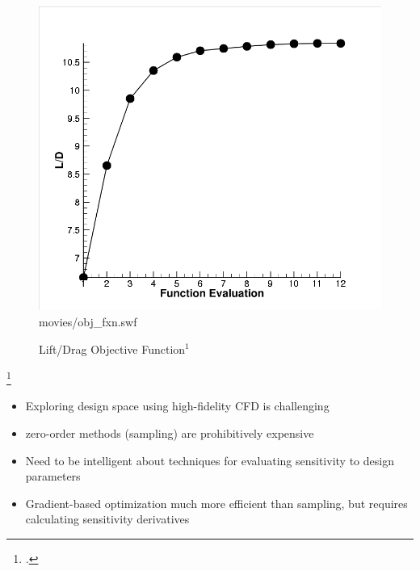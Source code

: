 \documentclass{beamer}
\begin{document}
\begin{frame}
\begin{figure}[ht]
\begin{minipage}[b]{0.45\linewidth}
\begin{cboxt}[white]
           {\includegraphics{movies/obj_fxn.png}}{movies/obj_fxn.swf}
         \end{cboxt}
         \vspace{-0.4cm}
         \caption{\tiny Lift/Drag Objective Function$^1$}
     \end{minipage}
  \end{figure}
  \footcitetext{Credit: FUN3D Tutorial Examples}
  \vspace{-1.2cm}
  \begin{itemize}
    \item Exploring design space using high-fidelity CFD is challenging
    \item zero-order methods (sampling) are prohibitively expensive
    \item Need to be intelligent about techniques for evaluating sensitivity to
      design parameters
    \item Gradient-based optimization much more efficient than sampling, but
      requires calculating sensitivity derivatives
  \end{itemize}
\end{frame}
\end{document}
